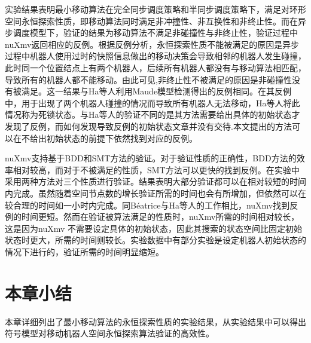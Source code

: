 实验结果表明最小移动算法在完全同步调度策略和半同步调度策略下，满足对环形空间永恒探索性质，即移动算法同时满足非冲撞性、非互换性和非终止性。而在异步调度模型下，验证的结果为移动算法不满足非碰撞性与非终止性，验证过程中nuXmv返回相应的反例。根据反例分析，永恒探索性质不能被满足的原因是异步过程中机器人使用过时的快照信息做出的移动决策会导致相邻的机器人发生碰撞，此时同一个位置结点上有两个机器人，后续所有机器人都没有与移动算法相匹配，导致所有的机器人都不能移动。由此可见,非终止性不被满足的原因是非碰撞性没有被满足。这一结果与Ha等人利用Maude模型检测得出的反例相同。在其反例中，用于出现了两个机器人碰撞的情况而导致所有机器人无法移动，Ha等人将此情况称为死锁状态。与Ha等人的验证不同的是其方法需要给出具体的初始状态才发现了反例，而如何发现导致反例的初始状态文章并没有交待.本文提出的方法可以在不给出初始状态的前提下依然找到对应的反例。

nuXmv支持基于BDD和SMT方法的验证。对于验证性质的正确性，BDD方法的效率相对较高，而对于不被满足的性质，SMT方法可以更快的找到反例。在实验中采用两种方法对三个性质进行验证。结果表明大部分验证都可以在相对较短的时间内完成。虽然随着空间节点数的增长验证所需的时间也会有所增加，但依然可以在较合理的时间如一小时内完成。同Béatrice与Ha等人的工作相比，nuXmv找到反例的时间更短。然而在验证被算法满足的性质时，nuXmv所需的时间相对较长，这是因为nuXmv 不需要设定具体的初始状态，因此其搜索的状态空间比固定初始状态时更大，所需的时间则较长。实验数据中有部分实验是设定机器人初始状态的情况下进行的，验证所需的时间明显缩短。

\section{本章小结}
本章详细列出了最小移动算法的永恒探索性质的实验结果，从实验结果中可以得出符号模型对移动机器人空间永恒探索算法验证的高效性。






